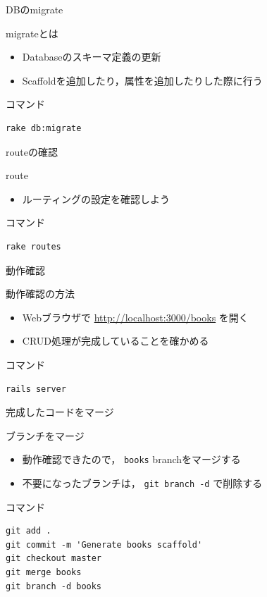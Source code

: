 \documentclass[t, aspectratio=169]{beamer}
\begin{document}
\begin{frame}[fragile,label=sec-7-1-3]{DBのmigrate}
 \begin{block}{migrateとは}
\begin{itemize}
\item Databaseのスキーマ定義の更新
\item Scaffoldを追加したり，属性を追加したりした際に行う
\end{itemize}
\end{block}

\begin{block}{コマンド}
\begin{verbatim}
rake db:migrate
\end{verbatim}
\end{block}
\end{frame}
\begin{frame}[fragile,label=sec-7-1-4]{routeの確認}
 \begin{block}{route}
\begin{itemize}
\item ルーティングの設定を確認しよう
\end{itemize}
\end{block}

\begin{block}{コマンド}
\begin{verbatim}
rake routes
\end{verbatim}
\end{block}
\end{frame}
\begin{frame}[fragile,label=sec-7-1-5]{動作確認}
 \begin{block}{動作確認の方法}
\begin{itemize}
\item Webブラウザで \url{http://localhost:3000/books} を開く
\item CRUD処理が完成していることを確かめる
\end{itemize}
\end{block}

\begin{block}{コマンド}
\begin{verbatim}
rails server
\end{verbatim}
\end{block}
\end{frame}
\begin{frame}[fragile,label=sec-7-1-6]{完成したコードをマージ}
 \begin{block}{ブランチをマージ}
\begin{itemize}
\item 動作確認できたので， \texttt{books} branchをマージする
\item 不要になったブランチは， \texttt{git branch -d} で削除する
\end{itemize}
\end{block}

\begin{block}{コマンド}
\begin{verbatim}
git add .
git commit -m 'Generate books scaffold'
git checkout master
git merge books
git branch -d books
\end{verbatim}
\end{block}
\end{frame}
\end{document}
